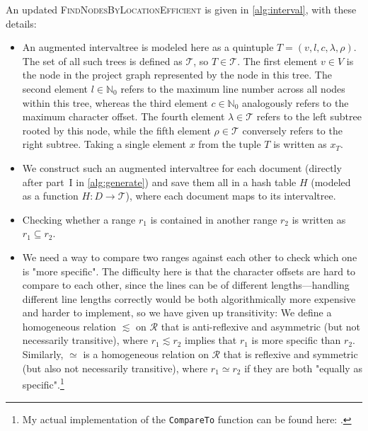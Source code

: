 \documentclass[../thesis]{subfiles}
\begin{document}
An updated \textsc{FindNodesByLocationEfficient} is given in \cref{alg:interval}, with these details:
\begin{itemize}
	\item An augmented \gls{intervaltree} is modeled here as a quintuple $T = (v, l, c, \lambda, \rho)$.
	      The set of all such trees is defined as $\mathcal{T}$, so $T \in \mathcal{T}$.
	      The first element $v \in V$ is the node in the project graph represented by the node in this tree.
	      The second element $l \in \mathbb{N}_0$ refers to the maximum line number across all nodes within this tree, whereas the third element $c \in \mathbb{N}_0$ analogously refers to the maximum character offset.
	      The fourth element $\lambda \in \mathcal{T}$ refers to the left subtree rooted by this node, while the fifth element $\rho \in \mathcal{T}$ conversely refers to the right subtree.
	      Taking a single element $x$ from the tuple $T$ is written as $x_T$.
	\item We construct such an augmented \gls{intervaltree} for each document (directly after part~I in \cref{alg:generate}) and save them all in a hash table $H$ (modeled as a function $H: D \rightarrow \mathcal{T}$), where each document maps to its \gls{intervaltree}.
	\item Checking whether a \gls{range} $r_1$ is contained in another \gls{range} $r_2$ is written as $r_1 \subseteq r_2$.
	\item We need a way to compare two \glspl{range} against each other to check which one is "more specific".
	      The difficulty here is that the character offsets are hard to compare to each other, since the lines can be of different lengths---handling different line lengths correctly would be both algorithmically more expensive and harder to implement, so we have given up transitivity:
	      We define a homogeneous relation $\lesssim$ on $\mathcal{R}$ that is anti-reflexive and asymmetric (but not necessarily transitive), where $r_1 \lesssim r_2$ implies that $r_1$ is more specific than $r_2$.
	      Similarly, $\simeq$ is a homogeneous relation on $\mathcal{R}$ that is reflexive and symmetric (but also not necessarily transitive), where $r_1 \simeq r_2$ if they are both "equally as specific".\footnote{
		      My actual implementation of the \texttt{CompareTo} function can be found here: .
	      }
\end{itemize}
\end{document}
